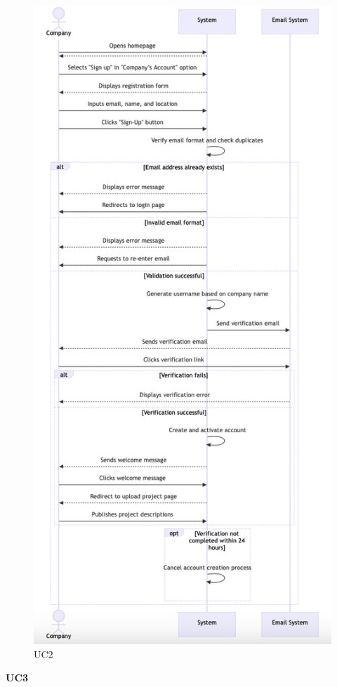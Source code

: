 \begin{figure}[H]
    \centering
    \includegraphics[width=0.5\linewidth]{RASD//Images/UC2.png}
    \caption{UC2}
\end{figure}
\pagebreak
\textbf{UC3}

